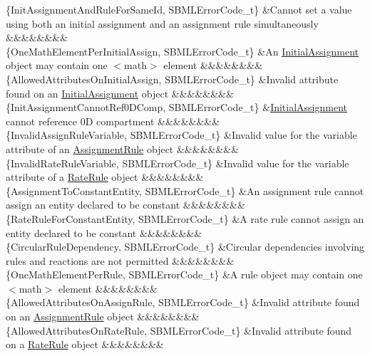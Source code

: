 \begin{DoxyParagraph}{}
\begin{longtabu}
\{Init\+Assignment\+And\+Rule\+For\+Same\+Id, S\+B\+M\+L\+Error\+Code\+\_\+t\} &Cannot set a value using both an initial assignment and an assignment rule simultaneously &&&&&&&&\\
\{One\+Math\+Element\+Per\+Initial\+Assign, S\+B\+M\+L\+Error\+Code\+\_\+t\} &An \hyperlink{class_initial_assignment}{Initial\+Assignment} object may contain one {\ttfamily $<$math$>$} element &&&&&&&&\\
\{Allowed\+Attributes\+On\+Initial\+Assign, S\+B\+M\+L\+Error\+Code\+\_\+t\} &Invalid attribute found on an \hyperlink{class_initial_assignment}{Initial\+Assignment} object &&&&&&&&\\
\{Init\+Assignment\+Cannot\+Ref0\+D\+Comp, S\+B\+M\+L\+Error\+Code\+\_\+t\} &\hyperlink{class_initial_assignment}{Initial\+Assignment} cannot reference 0D compartment &&&&&&&&\\
\{Invalid\+Assign\+Rule\+Variable, S\+B\+M\+L\+Error\+Code\+\_\+t\} &Invalid value for the \textquotesingle{}variable\textquotesingle{} attribute of an \hyperlink{class_assignment_rule}{Assignment\+Rule} object &&&&&&&&\\
\{Invalid\+Rate\+Rule\+Variable, S\+B\+M\+L\+Error\+Code\+\_\+t\} &Invalid value for the \textquotesingle{}variable\textquotesingle{} attribute of a \hyperlink{class_rate_rule}{Rate\+Rule} object &&&&&&&&\\
\{Assignment\+To\+Constant\+Entity, S\+B\+M\+L\+Error\+Code\+\_\+t\} &An assignment rule cannot assign an entity declared to be constant &&&&&&&&\\
\{Rate\+Rule\+For\+Constant\+Entity, S\+B\+M\+L\+Error\+Code\+\_\+t\} &A rate rule cannot assign an entity declared to be constant &&&&&&&&\\
\{Circular\+Rule\+Dependency, S\+B\+M\+L\+Error\+Code\+\_\+t\} &Circular dependencies involving rules and reactions are not permitted &&&&&&&&\\
\{One\+Math\+Element\+Per\+Rule, S\+B\+M\+L\+Error\+Code\+\_\+t\} &A rule object may contain one {\ttfamily $<$math$>$} element &&&&&&&&\\
\{Allowed\+Attributes\+On\+Assign\+Rule, S\+B\+M\+L\+Error\+Code\+\_\+t\} &Invalid attribute found on an \hyperlink{class_assignment_rule}{Assignment\+Rule} object &&&&&&&&\\
\{Allowed\+Attributes\+On\+Rate\+Rule, S\+B\+M\+L\+Error\+Code\+\_\+t\} &Invalid attribute found on a \hyperlink{class_rate_rule}{Rate\+Rule} object &&&&&&&&\\

\end{longtabu}
\end{DoxyParagraph}
